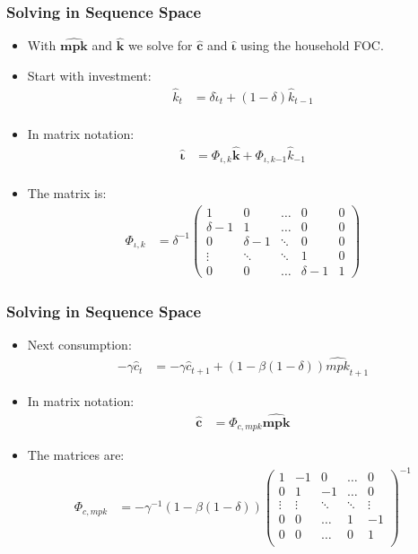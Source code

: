 \documentclass[english,xcolor=svgnames]{beamer}
\begin{document}
	
	\begin{frame}
		\frametitle{Solving in Sequence Space}
			\begin{itemize}
				\item With $\mathbf{\hat{mpk}}$ and $\mathbf{\hat{k}}$  we solve for $\mathbf{\hat{c}}$ and $\mathbf{\hat{\iota}}$ using the household FOC.
				\item Start with investment:
				\begin{align*}
					\hat{k}_{t} &=\delta \hat{\iota}_t + (1-\delta)\hat{k}_{t-1} \\
				\end{align*}
				\item In matrix notation:
				\begin{align*}
					\mathbf{\hat{\iota}} &= \Phi_{\iota,k}\mathbf{\hat{k}} + \Phi_{\iota,k{-1}}\hat{k}_{-1} \\
				\end{align*}
				\item The matrix is:
				\begin{align*}
					\Phi_{\iota,k}&=\delta^{-1}\begin{pmatrix} 1 & 0 & \hdots & 0 & 0 \\
						\delta-1 & 1 & \hdots & 0 & 0 \\
						0 & \delta-1 & \ddots & 0 & 0 \\
						\vdots & \ddots & \ddots & 1 & 0 \\
						0 & 0 & \hdots & \delta-1 & 1
					\end{pmatrix}
				\end{align*}
			\end{itemize}
	\end{frame}

	\begin{frame}
		\frametitle{Solving in Sequence Space}
			\begin{itemize}
				\item Next consumption:
				\begin{align*}
					- \gamma \hat{c}_t &= -\gamma  \hat{c}_{t+1} + (1 - \beta(1-\delta))  \hat{mpk}_{t+1} 
				\end{align*}
				\item In matrix notation:
				\begin{align*}
					\mathbf{\hat{c}} &= \Phi_{c,mpk}\mathbf{\hat{mpk}} 
				\end{align*}
				\item The matrices are:
				\begin{align*}
					\Phi_{c,mpk}&=-\gamma^{-1}(1-\beta(1-\delta))\begin{pmatrix}
						1 & -1 & 0 & \hdots & 0  \\
						0 & 1 & -1 & \hdots & 0  \\
						\vdots & \vdots & \ddots & \ddots & \vdots  \\
						0 & 0 & \hdots & 1 & -1 \\
						0 & 0 & \hdots & 0 & 1 \\
					\end{pmatrix}^{-1}
				\end{align*}
			\end{itemize}
	\end{frame}
	
\end{document}
